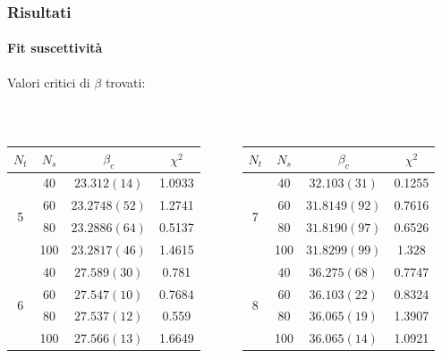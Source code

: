 \documentclass{beamer}
\begin{document}
\begin{frame}
	\frametitle{Risultati}
	\framesubtitle{Fit suscettività}

	Valori critici di $\beta$ trovati:

	\

	\begin{columns}
		\centering
		\begin{tabular}{|c|c|c|c|}
			\hline
			$N_t$ & $N_s$ & $\beta_c$ & $\chi^2$ \\
			\hline
			\multirow{4}{*}{5} 
			& 40  & $23.312(14)$   & 1.0933\\
			& 60  & $23.2748(52)$ & 1.2741 \\
			& 80  & $23.2886(64)$ & 0.5137 \\
			& 100 & $23.2817(46)$ & 1.4615 \\
			\hline
			\multirow{4}{*}{6} 
			& 40  & $27.589(30)$  & 0.781 \\
			& 60  & $27.547(10)$  & 0.7684 \\
			& 80  & $27.537(12)$ & 0.559 \\
			& 100 & $27.566(13)$ & 1.6649 \\
			\hline
		\end{tabular}

		\centering
		\begin{tabular}{|c|c|c|c|}
			\hline
			$N_t$ & $N_s$ & $\beta_c$ & $\chi^2$ \\
			\hline
			\multirow{4}{*}{7} 
			& 40  & $32.103(31) $  & 0.1255 \\
			& 60  & $31.8149(92)$ & 0.7616 \\
			& 80  & $31.8190(97)$  & 0.6526 \\
			& 100 & $31.8299(99)$ & 1.328 \\
			\hline
			\multirow{4}{*}{8} 
			& 40  & $36.275(68)$ & 0.7747 \\
			& 60  & $36.103(22)$ & 0.8324 \\
			& 80  & $36.065(19)$ & 1.3907 \\
			& 100 & $36.065(14)$ & 1.0921 \\
			\hline			
		\end{tabular}
	\end{columns}
\end{frame}
\end{document}
